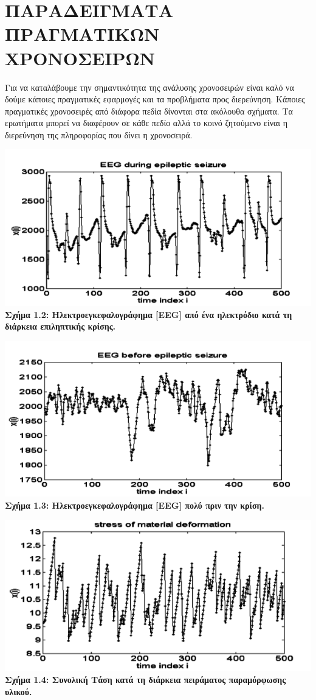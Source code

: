 \section{ΠΑΡΑΔΕΙΓΜΑΤΑ ΠΡΑΓΜΑΤΙΚΩΝ ΧΡΟΝΟΣΕΙΡΩΝ}
Για να καταλάβουμε την σημαντικότητα της ανάλυσης χρονοσειρών είναι καλό
να δούμε κάποιες πραγματικές εφαρμογές και τα προβλήματα προς διερεύνηση. Κάποιες πραγματικές χρονοσειρές από διάφορα πεδία δίνονται στα ακόλουθα σχήματα. Τα
ερωτήματα μπορεί να διαφέρουν σε κάθε πεδίο αλλά το κοινό ζητούμενο είναι η
διερεύνηση της πληροφορίας που δίνει η χρονοσειρά.
\begin{center}
\includegraphics[scale=0.5]{graf5_1.png}\\
\textbf{Σχήμα 1.2: Ηλεκτροεγκεφαλογράφημα [EEG] από ένα ηλεκτρόδιο κατά τη διάρκεια επιληπτικής κρίσης.}
\end{center}
\begin{center}
\includegraphics[scale=0.5]{graf5_2.png}\\
\textbf{Σχήμα 1.3: Ηλεκτροεγκεφαλογράφημα [EEG] πολύ πριν την κρίση.}
\end{center}
\begin{center}
\includegraphics[scale=0.5]{graf5_3.png}\\
\textbf{Σχήμα 1.4: Συνολική Τάση κατά τη διάρκεια πειράματος παραμόρφωσης υλικού.}
\end{center}
